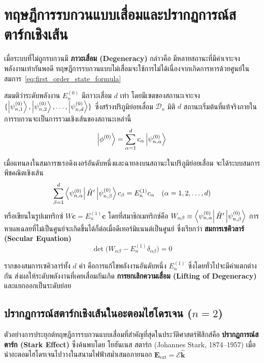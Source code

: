 \section{ทฤษฎีการรบกวนแบบเสื่อมและปรากฏการณ์สตาร์กเชิงเส้น}

เมื่อระบบที่ไม่ถูกรบกวนมี \textbf{ภาวะเสื่อม (Degeneracy)} กล่าวคือ มีหลายสถานะที่มีค่าเจาะจงพลังงานเท่ากันพอดี ทฤษฎีการรบกวนแบบไม่เสื่อมจะใช้การไม่ได้เนื่องจากเกิดการหารด้วยศูนย์ในสมการ~\eqref{eq:first_order_state_formula}

สมมติว่าระดับพลังงาน $E_n^{(0)}$ มีภาวะเสื่อม $d$ เท่า โดยมีเซตของสถานะเจาะจง $\{ \ket{\psi_{n, 1}^{(0)}}, \ket{\psi_{n, 2}^{(0)}}, \dots, \ket{\psi_{n, d}^{(0)}} \}$ ซึ่งสร้างปริภูมิย่อยเสื่อม $\mathcal{D}_n$ มิติ $d$ สถานะเริ่มต้นที่แท้จริงภายในการรบกวนจะเป็นการรวมเชิงเส้นของสถานะเหล่านี้
\begin{equation}
\ket{\phi^{(0)}} = \sum_{\alpha=1}^d c_\alpha \ket{\psi_{n, \alpha}^{(0)}}
\end{equation}

เมื่อแทนลงในสมการชเรอดิงเงอร์อันดับหนึ่งและฉายลงบนสถานะในปริภูมิย่อยเสื่อม จะได้ระบบสมการพีชคณิตเชิงเส้น
\begin{equation}
\sum_{\beta=1}^d \bra{\psi_{n, \alpha}^{(0)}} \hat{H}' \ket{\psi_{n, \beta}^{(0)}} c_\beta = E_n^{(1)} c_\alpha \quad (\alpha = 1, 2, \dots, d)
\end{equation}
หรือเขียนในรูปเมทริกซ์ $W \mathbf{c} = E_n^{(1)} \mathbf{c}$ โดยที่สมาชิกเมทริกซ์คือ $W_{\alpha\beta} \equiv \bra{\psi_{n, \alpha}^{(0)}} \hat{H}' \ket{\psi_{n, \beta}^{(0)}}$ การหาผลเฉลยที่ไม่เป็นศูนย์จะเกิดขึ้นได้ก็ต่อเมื่อดีเทอร์มิแนนต์เป็นศูนย์ ซึ่งเรียกว่า \textbf{สมการเซคิวลาร์ (Secular Equation)}
\begin{equation}
\det\big( W_{\alpha\beta} - E_n^{(1)} \delta_{\alpha\beta} \big) = 0
\label{eq:secular_equation}
\end{equation}

รากของสมการเซคิวลาร์ทั้ง $d$ ค่า คือการแก้ไขพลังงานอันดับหนึ่ง $E_n^{(1)}$ ซึ่งโดยทั่วไปจะมีค่าแตกต่างกัน ส่งผลให้ระดับพลังงานที่เคยเสื่อมกันเกิด \textbf{การยกเลิกความเสื่อม (Lifting of Degeneracy)} และแยกออกเป็นระดับย่อย

\subsection{ปรากฏการณ์สตาร์กเชิงเส้นในอะตอมไฮโดรเจน ($n=2$)}
ตัวอย่างการประยุกต์ทฤษฎีการรบกวนแบบเสื่อมที่สำคัญที่สุดในประวัติศาสตร์ฟิสิกส์คือ \textbf{ปรากฏการณ์สตาร์ก (Stark Effect)} ซึ่งค้นพบโดย โยฮันเนส สตาร์ก (Johannes Stark, 1874--1957) เมื่อนำอะตอมไฮโดรเจนไปวางในสนามไฟฟ้าสม่ำเสมอภายนอก $\mathbf{E}_{\text{ext}} = \mathcal{E} \hat{\mathbf{k}}$


